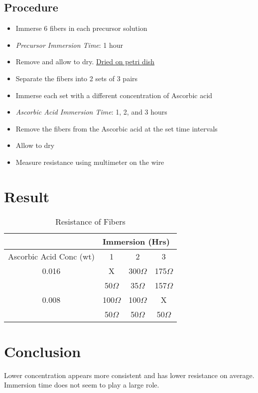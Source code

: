 \documentclass{article}
\begin{document}
\subsection{Procedure}
\begin{itemize}
    \item Immerse 6 fibers in each precursor solution
    \item \textit{Precursor Immersion Time}: 1 hour
    \item Remove and allow to dry. \underline{Dried on petri dish}
    \item Separate the fibers into 2 sets of 3 pairs
    \item Immerse each set with a different concentration of Ascorbic acid
    \item \textit{Ascorbic Acid Immersion Time}: 1, 2, and 3 hours
    \item Remove the fibers from the Ascorbic acid at the set time intervals 
    \item Allow to dry
    \item Measure resistance using multimeter on the wire
\end{itemize}

\pagebreak
\section{Result}
\begin{table}[h!]
\centering
\begin{tabular}{ |c|c|c|c| } 
 \hline
& \multicolumn{3}{l|}{Immersion (Hrs)} \\ \hline
Ascorbic Acid Conc (wt) & 1 & 2 & 3  \\ 
 \hline
 0.016  & X & 300$\Omega$ & 175$\Omega$ \\ 
 & 50$\Omega$ & 35$\Omega$  & 157$\Omega$ \\ 
 \hline
 0.008 & 100$\Omega$ & 100$\Omega$ & X \\ 
& 50$\Omega$ & 50$\Omega$ & 50$\Omega$  \\ 
 \hline
\end{tabular}
 \caption{Resistance of Fibers}
\label{table:1}
\end{table}

\section{Conclusion}
Lower concentration appears more consistent and has lower resistance on average. Immersion time does not seem to play a large role.
\end{document}
